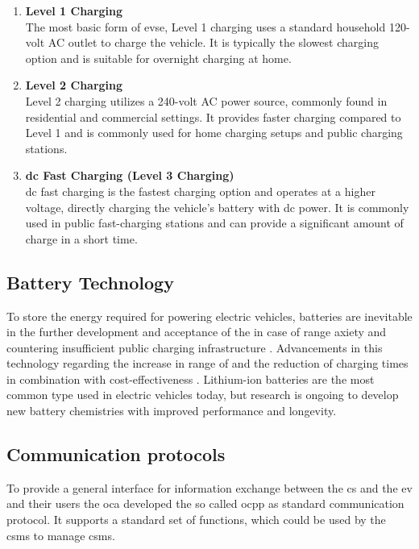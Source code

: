 \begin{enumerate}
    \item \textbf{Level 1 Charging}\\The most basic form of \acrshort{evse}, Level 1 charging uses a standard household 120-volt AC outlet to charge the vehicle. It is typically the slowest charging option and is suitable for overnight charging at home.
    \item \textbf{Level 2 Charging}\\Level 2 charging utilizes a 240-volt AC power source, commonly found in residential and commercial settings. It provides faster charging compared to Level 1 and is commonly used for home charging setups and public charging stations.
    \item \textbf{\acrshort{dc} Fast Charging (Level 3 Charging)}\\\acrshort{dc} fast charging is the fastest charging option and operates at a higher voltage, directly charging the vehicle's battery with \acrshort{dc} power. It is commonly used in public fast-charging stations and can provide a significant amount of charge in a short time.
\end{enumerate}

\subsection{Battery Technology}
\label{ch:Introduction:sec:Electric Mobility:ssec:Battery Technology}

To store the energy required for powering electric vehicles, batteries are inevitable in the further development and acceptance of the  in case of range axiety and countering insufficient public charging infrastructure \cite{basmadjian_interoperable_2019}. Advancements in this technology regarding the increase in range of  and the reduction of charging times in combination with cost-effectiveness . Lithium-ion batteries are the most common type used in electric vehicles today, but research is ongoing to develop new battery chemistries with improved performance and longevity.

\subsection{Communication protocols}
\label{ch:Introduction:sec:Electric Mobility:ssec:Communication protocols}

To provide a general interface for information exchange between the \acrfull{cs} and the \acrfull{ev} and their users the \acrfull{oca} developed the so called \acrfull{ocpp} as standard communication protocol. It supports a standard set of functions, which could be used by the \acrfull{csms} to manage \acrshort{csms}.

